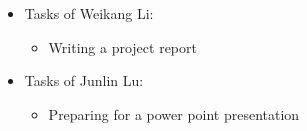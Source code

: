 \begin{itemize}
\begin{itemize}
\begin{itemize}
\begin{itemize}
		\end{itemize}
		\item {Tasks of Weikang Li:}
		\begin{itemize}
			\item {Writing a project report}
		\end{itemize}
		\item {Tasks of Junlin Lu:}
		\begin{itemize}
			\item {Preparing for a power point presentation}
		\end{itemize}
	\end{itemize}
\end{itemize} 
\end{itemize}

